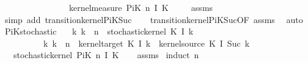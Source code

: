 \begin{isabellebody}
\ \ \ \ \ \ \ \ \ \ \ \ \ \ \ \ {\isasympartial}kernel{\isacharunderscore}{\kern0pt}measure\ {\isacharparenleft}{\kern0pt}PiK\ n\ I\ K{\isacharparenright}{\kern0pt}\ {\isasymomega}{\isacharparenright}{\kern0pt}{\isachardoublequoteclose}\isanewline
%
\isadelimproof
\ \ %
\endisadelimproof
%
\isatagproof
{}\isamarkupfalse%
\ assms\ \isamarkupfalse%
\ {\isacharparenleft}{\kern0pt}simp\ add{\isacharcolon}{\kern0pt}\ transition{\isacharunderscore}{\kern0pt}kernel{\isacharunderscore}{\kern0pt}PiK{\isacharunderscore}{\kern0pt}Suc{\isacharparenright}{\kern0pt}\isanewline
\ \ \isamarkupfalse%
\ transition{\isacharunderscore}{\kern0pt}kernel{\isacharunderscore}{\kern0pt}PiK{\isacharunderscore}{\kern0pt}Suc{\isacharbrackleft}{\kern0pt}OF\ assms{\isacharparenleft}{\kern0pt}{}{\isacharminus}{\kern0pt}{}{\isacharparenright}{\kern0pt}{\isacharbrackright}{\kern0pt}\ \isamarkupfalse%
\ auto%
\endisatagproof
{\isafoldproof}%
%
\isadelimproof
\isanewline
%
\endisadelimproof
\isanewline
{}\isamarkupfalse%
\ PiK{\isacharunderscore}{\kern0pt}stochastic{\isacharcolon}{\kern0pt}\isanewline
\ \ \ {\isachardoublequoteopen}{\isasymAnd}k{\isachardot}{\kern0pt}\ k\ {\isasymle}\ n\ {\isasymLongrightarrow}\ stochastic{\isacharunderscore}{\kern0pt}kernel\ {\isacharparenleft}{\kern0pt}K\ {\isacharparenleft}{\kern0pt}I\ k{\isacharparenright}{\kern0pt}{\isacharparenright}{\kern0pt}{\isachardoublequoteclose}\isanewline
\ \ \ \ \ \ \ \ \ \ {\isachardoublequoteopen}{\isasymAnd}k{\isachardot}{\kern0pt}\ k\ {\isacharless}{\kern0pt}\ n\ {\isasymLongrightarrow}\ kernel{\isacharunderscore}{\kern0pt}target\ {\isacharparenleft}{\kern0pt}K\ {\isacharparenleft}{\kern0pt}I\ k{\isacharparenright}{\kern0pt}{\isacharparenright}{\kern0pt}\ {\isacharequal}{\kern0pt}\ kernel{\isacharunderscore}{\kern0pt}source\ {\isacharparenleft}{\kern0pt}K\ {\isacharparenleft}{\kern0pt}I\ {\isacharparenleft}{\kern0pt}Suc\ k{\isacharparenright}{\kern0pt}{\isacharparenright}{\kern0pt}{\isacharparenright}{\kern0pt}{\isachardoublequoteclose}\isanewline
\ \ \ {\isachardoublequoteopen}stochastic{\isacharunderscore}{\kern0pt}kernel\ {\isacharparenleft}{\kern0pt}PiK\ n\ I\ K{\isacharparenright}{\kern0pt}{\isachardoublequoteclose}\isanewline
%
\isadelimproof
\ \ %
\endisadelimproof
%
\isatagproof
{}\isamarkupfalse%
\ assms\isanewline
{}\isamarkupfalse%
\ {\isacharparenleft}{\kern0pt}induct\ n{\isacharparenright}{\kern0pt}\isanewline
\ \ \isamarkupfalse%

\end{isabellebody}
